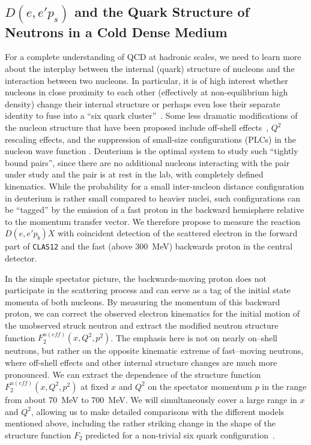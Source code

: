 \boldmath
\subsection{$D(e,e'p_s)$ and the Quark Structure of Neutrons in a Cold
Dense Medium}
\unboldmath

For a complete understanding of QCD at hadronic scales, we need to 
learn more about the interplay between the internal (quark) structure 
of nucleons and the interaction between two nucleons. In particular, it 
is of high interest whether nucleons in close proximity to each other
(effectively at non-equilibrium high density) change their internal 
structure or perhaps even lose their separate identity to fuse into a 
``six quark cluster''~\cite{Carlson}.  Some less dramatic modifications 
of the nucleon structure that have been proposed include off-shell 
effects~\cite{MT}, $Q^2$ rescaling effects, and the suppression of
small-size configurations (PLCs) in the nucleon wave function
\cite{FS81,FS85}.  Deuterium is the optimal system to study such 
``tightly bound pairs'', since there are no additional nucleons 
interacting with the pair under study and the pair is at rest in the lab, 
with completely defined kinematics.  While the probability for a small 
inter-nucleon distance configuration in deuterium is rather small 
compared to heavier nuclei, such configurations can be ``tagged'' by the 
emission of a fast proton in the backward hemisphere relative to the 
momentum transfer vector.  We therefore propose to measure the reaction 
$D(e,e'p_b)X$ with coincident detection of the scattered electron in the 
forward part of {\tt CLAS12} and the fast (above 300~MeV) backwards 
proton in the central detector.

In the simple spectator picture, the backwards-moving proton does not 
participate in the scattering process and can serve as a tag of the 
initial state momenta of both nucleons.  By measuring the momentum of
this backward proton, we can correct the observed electron kinematics 
for the initial motion of the unobserved struck neutron and extract the 
modified neutron structure function $F_2^{n(eff)}(x, Q^2, p^2)$.
The emphasis here is not on nearly on--shell neutrons, but rather on
the opposite kinematic extreme of fast--moving neutrons, where off-shell
effects and other internal structure changes are much more pronounced.
We can extract the dependence of the structure function 
$F_2^{n(eff)}(x, Q^2, p^2)$ at fixed $x$ and $Q^2$ on the spectator
momentum $p$ in the range from about 70~MeV to 700~MeV.  We will 
simultaneously cover a large range in $x$ and $Q^2$, allowing us to make 
detailed comparisons with the different models mentioned above, including 
the rather striking change in the shape of the structure function $F_2$ 
predicted for a non-trivial six quark configuration~\cite{Carlson}.

